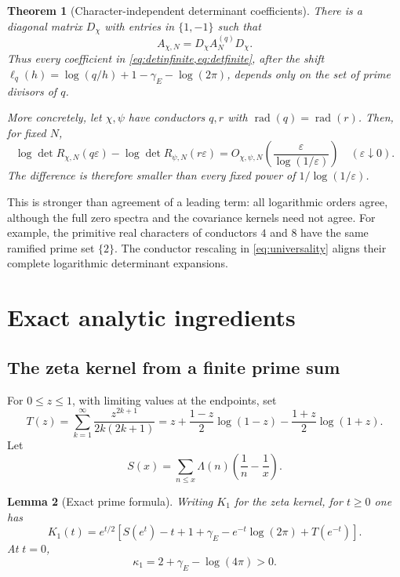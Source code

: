 \documentclass[11pt]{article}
\newtheorem{theorem}{Theorem}[section]
\newtheorem{lemma}[theorem]{Lemma}
\theoremstyle{definition}
\newcommand{\rad}{\operatorname{rad}}
\newcommand{\gE}{\gamma_{\!E}}
\newcommand{\kap}{\kappa}
\begin{document}
\begin{theorem}[Character-independent determinant coefficients]\label{thm:gauge}
There is a diagonal matrix $D_\chi$ with entries in $\{1,-1\}$ such that
\begin{equation}\label{eq:gauge}
 A_{\chi,N}=D_\chi A_N^{(q)}D_\chi.
\end{equation}
Thus every coefficient in \cref{eq:detinfinite,eq:detfinite}, after the shift
$\ell_q(h)=\log(q/h)+1-\gE-\log(2\pi)$, depends only on the set of prime
divisors of $q$.

More concretely, let $\chi,\psi$ have conductors $q,r$ with
$\rad(q)=\rad(r)$. Then, for fixed $N$,
\begin{equation}\label{eq:universality}
 \log\det R_{\chi,N}(q\varepsilon)
 -\log\det R_{\psi,N}(r\varepsilon)
 =O_{\chi,\psi,N}\left(\frac{\varepsilon}{\log(1/\varepsilon)}\right)
 \quad(\varepsilon\downarrow0).
\end{equation}
The difference is therefore smaller than every fixed power of
$1/\log(1/\varepsilon)$.
\end{theorem}

This is stronger than agreement of a leading term: all logarithmic orders agree,
although the full zero spectra and the covariance kernels need not agree.
For example, the primitive real characters of conductors $4$ and $8$ have the same
ramified prime set $\{2\}$. The conductor rescaling in \cref{eq:universality}
aligns their complete logarithmic determinant expansions.

\section{Exact analytic ingredients}

\subsection{The zeta kernel from a finite prime sum}

For $0\le z\le1$, with limiting values at the endpoints, set
\begin{equation}\label{eq:T}
 T(z)=\sum_{k=1}^{\infty}\frac{z^{2k+1}}{2k(2k+1)}
 =z+\frac{1-z}{2}\log(1-z)-\frac{1+z}{2}\log(1+z).
\end{equation}
Let
\[
 S(x)=\sum_{n\le x}\Lambda(n)\left(\frac1n-\frac1x\right).
\]

\begin{lemma}[Exact prime formula]\label{lem:explicit}
Writing $K_1$ for the zeta kernel, for $t\ge0$ one has
\begin{equation}\label{eq:primeK}
 K_1(t)=e^{t/2}\left[S(e^t)-t+1+\gE
                    -e^{-t}\log(2\pi)+T(e^{-t})\right].
\end{equation}
At $t=0$,
\begin{equation}\label{eq:kappa}
 \kap_1=2+\gE-\log(4\pi)>0.
\end{equation}
\end{lemma}
\end{document}
